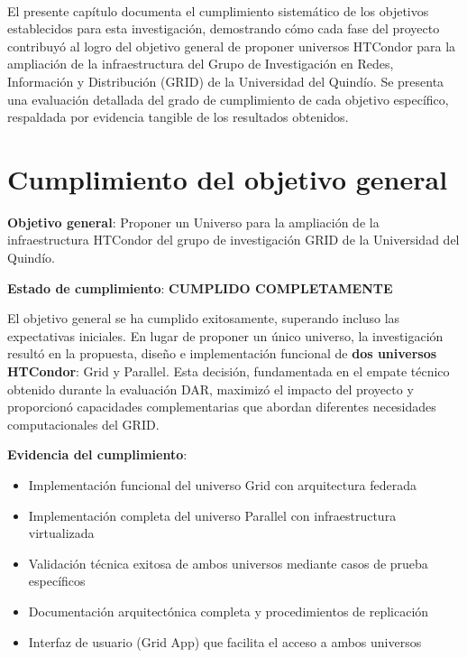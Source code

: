 \label{cap:cumplimiento-objetivos}
\mbox{}\\

El presente capítulo documenta el cumplimiento sistemático de los objetivos establecidos para esta investigación, demostrando cómo cada fase del proyecto contribuyó al logro del objetivo general de proponer universos HTCondor para la ampliación de la infraestructura del Grupo de Investigación en Redes, Información y Distribución (GRID) de la Universidad del Quindío. Se presenta una evaluación detallada del grado de cumplimiento de cada objetivo específico, respaldada por evidencia tangible de los resultados obtenidos.

\section{Cumplimiento del objetivo general}
\noindent

\textbf{Objetivo general}: Proponer un Universo para la ampliación de la infraestructura HTCondor del grupo de investigación GRID de la Universidad del Quindío.

\textbf{Estado de cumplimiento}: \textbf{CUMPLIDO COMPLETAMENTE}

El objetivo general se ha cumplido exitosamente, superando incluso las expectativas iniciales. En lugar de proponer un único universo, la investigación resultó en la propuesta, diseño e implementación funcional de \textbf{dos universos HTCondor}: Grid y Parallel. Esta decisión, fundamentada en el empate técnico obtenido durante la evaluación DAR, maximizó el impacto del proyecto y proporcionó capacidades complementarias que abordan diferentes necesidades computacionales del GRID.

\textbf{Evidencia del cumplimiento}:
\begin{itemize}
    \item Implementación funcional del universo Grid con arquitectura federada
    \item Implementación completa del universo Parallel con infraestructura virtualizada
    \item Validación técnica exitosa de ambos universos mediante casos de prueba específicos
    \item Documentación arquitectónica completa y procedimientos de replicación
    \item Interfaz de usuario (Grid App) que facilita el acceso a ambos universos
\end{itemize}

